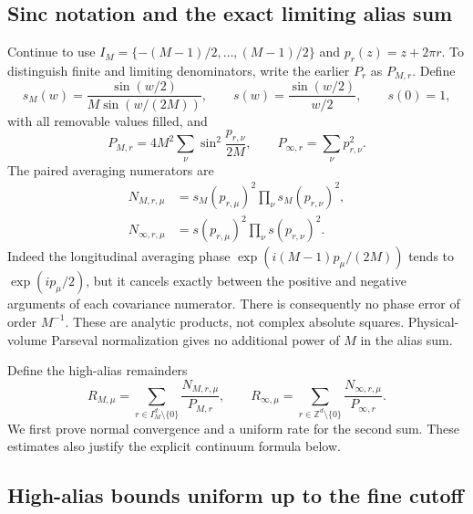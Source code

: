\documentclass[11pt]{article}
\theoremstyle{remark}
\begin{document}
\subsection{Sinc notation and the exact limiting alias sum}

Continue to use $I_M=\{-(M-1)/2,\ldots,(M-1)/2\}$ and
$p_r(z)=z+2\pi r$. To distinguish finite and limiting denominators,
write the earlier $P_r$ as $P_{M,r}$. Define
\begin{equation}\label{limit-sinc}
 s_M(w)=\frac{\sin(w/2)}{M\sin(w/(2M))},\qquad
 s(w)=\frac{\sin(w/2)}{w/2},\qquad s(0)=1,
\end{equation}
with all removable values filled, and
\begin{equation}\label{limit-denominators}
 P_{M,r}=4M^2\sum_\nu\sin^2\frac{p_{r,\nu}}{2M},
 \qquad P_{\infty,r}=\sum_\nu p_{r,\nu}^2.
\end{equation}
The paired averaging numerators are
\begin{align}
 N_{M,r,\mu}
 &=s_M(p_{r,\mu})^2\prod_\nu s_M(p_{r,\nu})^2,
 \label{limit-numerator-finite}\\
 N_{\infty,r,\mu}
 &=s(p_{r,\mu})^2\prod_\nu s(p_{r,\nu})^2.
 \label{limit-numerator-infinite}
\end{align}
Indeed the longitudinal averaging phase
$\exp(i(M-1)p_\mu/(2M))$ tends to $\exp(ip_\mu/2)$, but it
cancels exactly between the positive and negative arguments of each
covariance numerator. There is consequently no phase error of order
$M^{-1}$. These are analytic products, not complex absolute squares.
Physical-volume Parseval normalization gives no additional power of
$M$ in the alias sum.

Define the high-alias remainders
\begin{equation}\label{limit-remainders}
 R_{M,\mu}=
 \sum_{r\in I_M^d\setminus\{0\}}\frac{N_{M,r,\mu}}{P_{M,r}},
 \qquad
 R_{\infty,\mu}=
 \sum_{r\in\mathbb Z^d\setminus\{0\}}
                         \frac{N_{\infty,r,\mu}}{P_{\infty,r}}.
\end{equation}
We first prove normal convergence and a uniform rate for the second
sum. These estimates also justify the explicit continuum formula below.

\subsection{High-alias bounds uniform up to the fine cutoff}
\end{document}
